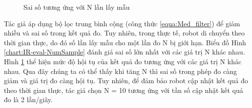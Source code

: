 \begin{figure}[htbp]
\centering
{}
\hspace{8pt}
    \caption{Sai số tương ứng với N lần lấy mẫu}
    \label{fig:chart-IR-N-errorbar}
\end{figure}

Tác giả áp dụng bộ lọc trung bình cộng (công thức \ref{equa:Med_filter}) để giảm nhiễu và sai số trong kết quả đo. Tuy nhiên, trong thực tế, robot di chuyển theo thời gian thực, do đó số lần lấy mẫu cho một lần đo N bị giới hạn. Biểu đồ Hình \ref{chart:IR-eval-NumSample} đánh giá sai số lớn nhất với các giá trị N khác nhau. Hình \ref{fig:chart-IR-N-errorbar} thể hiện mức độ hội tụ của kết quả đo tương ứng với các giá trị N khác nhau. Qua đây chúng ta có thể thấy khi tăng N thì sai số trong phép đo càng giảm và giá trị đo càng hội tụ. Tuy nhiên, để đảm bảo robot cập nhật kết quả đo theo thời gian thực, tác giả chọn N = 10 tương ứng với tần số cập nhật kết quả đo là 2 lần/giây.

